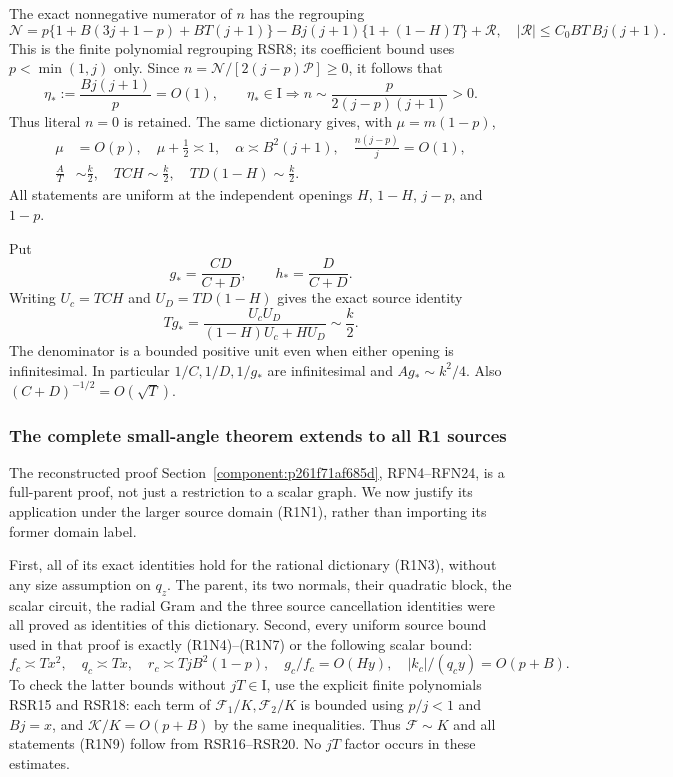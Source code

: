 The exact nonnegative numerator of $n$ has the regrouping
\[
 \mathcal N=p\{1+B(3j+1-p)+BT(j+1)\}
       -Bj(j+1)\{1+(1-H)T\}+\mathcal R ,
 \quad |\mathcal R|\le C_0BT\,Bj(j+1).                   \tag{R1N5}
\]
This is the finite polynomial regrouping RSR8; its coefficient bound
uses $p<\min(1,j)$ only.  Since
$n=\mathcal N/[2(j-p)\mathcal P]\ge0$, it follows that
\[
 \eta_*:=\frac{Bj(j+1)}p=O(1),\qquad
 \eta_*\in\mathrm I
 \Longrightarrow n\sim\frac{p}{2(j-p)(j+1)}>0.           \tag{R1N6}
\]
Thus literal $n=0$ is retained.  The same dictionary gives, with
$\mu=m(1-p)$,
\[
\begin{aligned}
 \mu&=O(p),\quad \mu+\tfrac12\asymp1,\quad
 \alpha\asymp B^2(j+1),\quad \frac{n(j-p)}j=O(1),\\
 \frac AT&\sim\frac k2,\quad
 TCH\sim\frac k2,\quad TD(1-H)\sim\frac k2.
\end{aligned}                                          \tag{R1N7}
\]
All statements are uniform at the independent openings $H$, $1-H$,
$j-p$, and $1-p$.

Put
\[
 g_*=\frac{CD}{C+D},\qquad h_*=\frac D{C+D}.
\]
Writing $U_c=TCH$ and $U_D=TD(1-H)$ gives the exact source identity
\[
 Tg_*=\frac{U_cU_D}{(1-H)U_c+HU_D}\sim\frac k2.          \tag{R1N8}
\]
The denominator is a bounded positive unit even when either opening
is infinitesimal.  In particular
$1/C,1/D,1/g_*$ are infinitesimal and
$Ag_*\sim k^2/4$.  Also $(C+D)^{-1/2}=O(\sqrt T)$.

\subsubsection*{The complete small-angle theorem extends to all R1 sources}

The reconstructed proof Section~\ref{component:p261f71af685d}, RFN4--RFN24,
is a full-parent proof, not just a restriction to a scalar graph.
We now justify its application under the larger source domain
(R1N1), rather than importing its former domain label.

First, all of its exact identities hold for the rational dictionary
(R1N3), without any size assumption on $q_z$.  The parent, its two
normals, their quadratic block, the scalar circuit, the radial Gram
and the three source cancellation identities were all proved as
identities of this dictionary.  Second, every uniform source bound
used in that proof is exactly (R1N4)--(R1N7) or the following scalar
bound:
\[
 f_c\asymp Tx^2,\quad q_c\asymp Tx,\quad
 r_c\asymp TjB^2(1-p),\quad
 g_c/f_c=O(Hy),\quad |k_c|/(q_cy)=O(p+B).                \tag{R1N9}
\]
To check the latter bounds without $jT\in\mathrm I$, use the explicit
finite polynomials RSR15 and RSR18: each term of
$\mathcal F_1/K,\mathcal F_2/K$ is bounded using $p/j<1$
and $Bj=x$, and $\mathcal K/K=O(p+B)$ by the same inequalities.
Thus $\mathcal F\sim K$ and all statements (R1N9) follow from
RSR16--RSR20.  No $jT$ factor occurs in these estimates.

